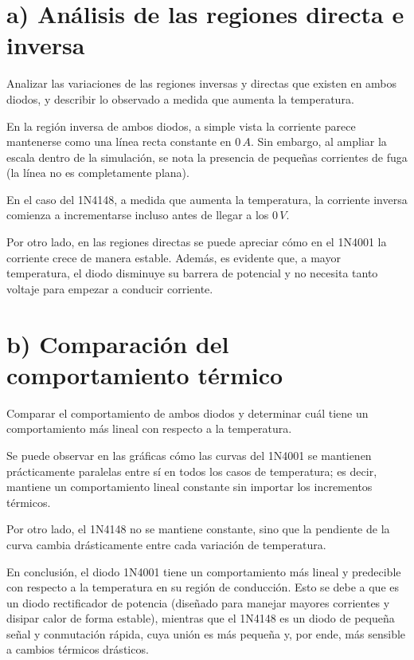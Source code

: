 \documentclass[journal]{IEEEtran}
\begin{document}
\section*{a) Análisis de las regiones directa e inversa}

Analizar las variaciones de las regiones inversas y directas que existen en ambos 
diodos, y describir lo observado a medida que aumenta la temperatura.

En la región inversa de ambos diodos, a simple vista la corriente parece mantenerse como 
una línea recta constante en $0\,A$. Sin embargo, al ampliar la escala dentro de la simulación, 
se nota la presencia de pequeñas corrientes de fuga (la línea no es completamente plana). 

En el caso del 1N4148, a medida que aumenta la temperatura, la corriente inversa 
comienza a incrementarse incluso antes de llegar a los $0\,V$.

Por otro lado, en las regiones directas se puede apreciar cómo en el 1N4001 la corriente 
crece de manera estable. Además, es evidente que, a mayor temperatura, el diodo 
disminuye su barrera de potencial y no necesita tanto voltaje para empezar a conducir 
corriente.

\section*{b) Comparación del comportamiento térmico}

Comparar el comportamiento de ambos diodos y determinar cuál tiene un 
comportamiento más lineal con respecto a la temperatura.

Se puede observar en las gráficas cómo las curvas del 1N4001 se mantienen prácticamente 
paralelas entre sí en todos los casos de temperatura; es decir, mantiene un comportamiento 
lineal constante sin importar los incrementos térmicos. 

Por otro lado, el 1N4148 no se mantiene constante, sino que la pendiente de la curva cambia 
drásticamente entre cada variación de temperatura.

En conclusión, el diodo 1N4001 tiene un comportamiento más lineal y predecible con 
respecto a la temperatura en su región de conducción. Esto se debe a que es un diodo 
rectificador de potencia (diseñado para manejar mayores corrientes y disipar calor de forma 
estable), mientras que el 1N4148 es un diodo de pequeña señal y conmutación rápida, cuya 
unión es más pequeña y, por ende, más sensible a cambios térmicos drásticos.
\end{document}
